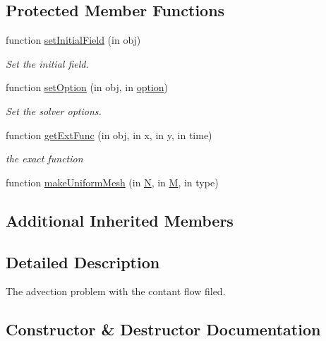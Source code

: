 \subsection*{Protected Member Functions}
\begin{DoxyCompactItemize}
\item 
function \hyperlink{class_const_adv_uniform_mesh2d_a9fe649653720106b66ad4fc61bf37e04}{set\+Initial\+Field} (in obj)
\begin{DoxyCompactList}\small\item\em Set the initial field. \end{DoxyCompactList}\item 
function \hyperlink{class_const_adv_uniform_mesh2d_a6f9d7678af1c64cc4597cb5efe8612df}{set\+Option} (in obj, in \hyperlink{class_ndg_phys_af91f4c54b93504e76b38a5693774dff1}{option})
\begin{DoxyCompactList}\small\item\em Set the solver options. \end{DoxyCompactList}\item 
function \hyperlink{class_const_adv_uniform_mesh2d_a6aa3180c8b99898d5ec889f59c8c1ea6}{get\+Ext\+Func} (in obj, in x, in y, in time)
\begin{DoxyCompactList}\small\item\em the exact function \end{DoxyCompactList}\item 
function \hyperlink{class_const_adv_uniform_mesh2d_a53c7892343ee7cf90e413e571471aee0}{make\+Uniform\+Mesh} (in \hyperlink{class_const_adv_uniform_mesh2d_a4fe5c3963150d921550e7041efde62af}{N}, in \hyperlink{class_const_adv_uniform_mesh2d_a1bbfe1ed756e54d1ed72c02f39ac433c}{M}, in type)
\end{DoxyCompactItemize}
\subsection*{Additional Inherited Members}


\subsection{Detailed Description}
The advection problem with the contant flow filed. 

\subsection{Constructor \& Destructor Documentation}
\mbox{\label{class_const_adv_uniform_mesh2d_aa9109341156afcc57277843278e0d7bf}} 
